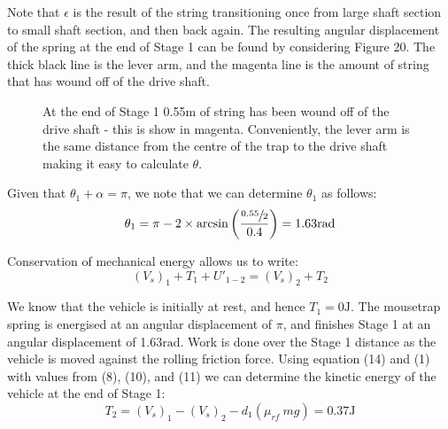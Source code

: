 \documentclass[a4paper]{article}
\begin{document}
Note that $\epsilon$ is the result of the string transitioning once from large shaft section to small shaft section, and then back again. The resulting angular displacement of the spring at the end of Stage 1 can be found by considering Figure 20. The thick black line is the lever arm, and the magenta line is the amount of string that has wound off of the drive shaft.

\begin{figure}[h]
	\centering
	\caption{At the end of Stage 1 0.55m of string has been wound off of the drive shaft - this is show in magenta. Conveniently, the lever arm is the same distance from the centre of the trap to the drive shaft making it easy to calculate $\theta$.}
\end{figure}

Given that $\theta_1 + \alpha = \pi$, we note that we can determine $\theta_1$ as follows:
\begin{equation}
	\theta_1 = \pi - 2 \times \arcsin \bigg( \frac{\sfrac{0.55}{2}}{0.4} \bigg) = 1.63\si{\radian}
\end{equation}

Conservation of mechanical energy allows us to write:
\begin{equation}
	(V_s)_1 + T_1 + U'_{1-2} = (V_s)_2 + T_2
\end{equation}

We know that the vehicle is initially at rest, and hence $T_1 = 0\si{\joule}$. The mousetrap spring is energised at an angular displacement of $\pi$, and finishes Stage 1 at an angular displacement of 1.63$\si{\radian}$. Work is done over the Stage 1 distance as the vehicle is moved against the rolling friction force. Using equation (14) and (1) with values from (8), (10), and (11) we can determine the kinetic energy of the vehicle at the end of Stage 1:
\begin{equation}
	T_2 = (V_s)_1 - (V_s)_2 - d_1 (\mu_{rf} \ mg) = 0.37\si{\joule}
\end{equation}
\end{document}
